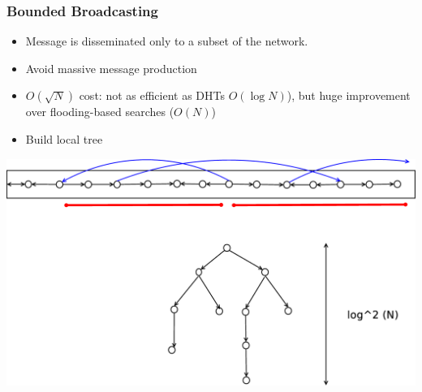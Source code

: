 \documentclass[red]{beamer}
\begin{document}
\begin{frame}
\frametitle{Bounded Broadcasting}
\begin{itemize}
\item
Message is disseminated only to a subset of the network.
\item
Avoid massive message production
\item $O(\sqrt{N})$ cost: not as efficient as DHTs $O(\log N)$), but huge improvement over flooding-based searches ($O(N)$)
\item Build local tree
\end{itemize}
\centering
\includegraphics[scale=0.1]{figs/multi}

\end{frame}
\end{document}

